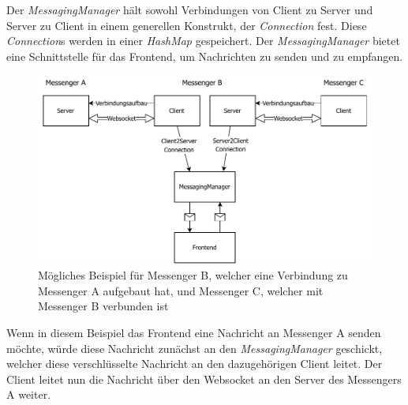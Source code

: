 \documentclass[a4paper,ngerman, headheight=28pt,12pt]{scrartcl}
\begin{document}
Der \textit{MessagingManager} hält sowohl Verbindungen von Client zu Server und Server zu Client in einem generellen Konstrukt, der \textit{Connection} fest. Diese \textit{Connection}s werden in einer \textit{HashMap} gespeichert. Der \textit{MessagingManager} bietet eine Schnittstelle für das Frontend, um Nachrichten zu senden und zu empfangen.
\begin{figure}[h]
  \centering
  \includegraphics[width=\textwidth]{diagrams/messaging_messenger.pdf}
  \caption{Mögliches Beispiel für Messenger B, welcher eine Verbindung zu Messenger A aufgebaut hat, und Messenger C, welcher mit Messenger B verbunden ist \label{fig:MessagingMessenger}}
\end{figure}
Wenn in diesem Beispiel das Frontend eine Nachricht an Messenger A senden möchte, würde diese Nachricht zunächst an den \textit{MessagingManager} geschickt, welcher diese verschlüsselte Nachricht an den dazugehörigen Client leitet. Der Client leitet nun die Nachricht über den Websocket an den Server des Messengers A weiter.
\end{document}
